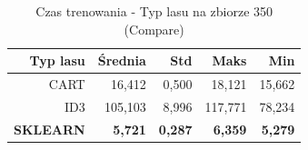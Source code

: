 \begin{table}[htbp]
\centering
\small
\setlength{\tabcolsep}{6pt}
\renewcommand{\arraystretch}{1.2}
\caption{Czas trenowania - Typ lasu na zbiorze 350 (Compare)}
\label{tab:Compare_on_350_time}
\begin{tabular}{r|r|r|r|r}
\toprule
Typ lasu & Średnia & Std & Maks & Min \\
\hline
CART & 16,412 & 0,500 & 18,121 & 15,662 \\
ID3 & 105,103 & 8,996 & 117,771 & 78,234 \\
\textbf{SKLEARN} & \textbf{5,721} & \textbf{0,287} & \textbf{6,359} & \textbf{5,279} \\
\bottomrule
\end{tabular}
\end{table}